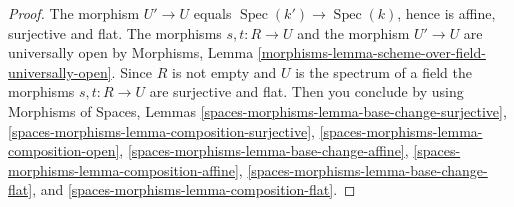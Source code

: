 \documentclass{stacks-project}
\theoremstyle{plain}
\theoremstyle{definition}
\theoremstyle{remark}
\numberwithin{equation}{subsection}
\def\Spec{\mathop{\mathrm{Spec}}}
\begin{document}
\begin{proof}
The morphism $U' \to U$ equals $\Spec(k') \to \Spec(k)$,
hence is affine, surjective and flat. The morphisms $s, t : R \to U$
and the morphism $U' \to U$ are universally open by
Morphisms, Lemma \ref{morphisms-lemma-scheme-over-field-universally-open}.
Since $R$ is not empty and $U$ is the spectrum of a field the morphisms
$s, t : R \to U$ are surjective and flat. Then you conclude by using
Morphisms of Spaces, Lemmas
\ref{spaces-morphisms-lemma-base-change-surjective},
\ref{spaces-morphisms-lemma-composition-surjective},
\ref{spaces-morphisms-lemma-composition-open},
\ref{spaces-morphisms-lemma-base-change-affine},
\ref{spaces-morphisms-lemma-composition-affine},
\ref{spaces-morphisms-lemma-base-change-flat}, and
\ref{spaces-morphisms-lemma-composition-flat}.
\end{proof}
\end{document}

